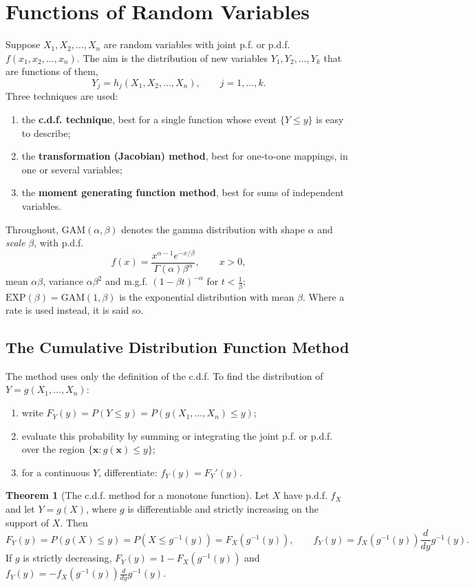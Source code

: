 \documentclass[12pt,a4paper]{report}
\theoremstyle{definition}
\newtheorem{thm}{Theorem}[section]
\theoremstyle{plain}
\begin{document}
\section{Functions of Random Variables}

Suppose $X_1, X_2, \dots , X_n$ are random variables with joint p.f. or p.d.f.
$f(x_1, x_2, \dots , x_n)$. The aim is the distribution of new variables
$Y_1, Y_2, \dots, Y_k$ that are functions of them,
\[Y_j = h_j(X_1, X_2, \dots, X_n),\qquad j = 1,\dots,k .\]
Three techniques are used:
\begin{enumerate}
\item the \textbf{c.d.f. technique}, best for a single function whose event
$\{Y\leq y\}$ is easy to describe;
\item the \textbf{transformation (Jacobian) method}, best for one-to-one
mappings, in one or several variables;
\item the \textbf{moment generating function method}, best for sums of
independent variables.
\end{enumerate}

Throughout, $\text{GAM}(\alpha,\beta)$ denotes the gamma distribution with shape
$\alpha$ and \emph{scale} $\beta$, with p.d.f.
\[f(x) = \frac{x^{\alpha - 1}e^{-x/\beta}}{\Gamma(\alpha)\beta^\alpha},\qquad
x>0 ,\]
mean $\alpha\beta$, variance $\alpha\beta^2$ and m.g.f. $(1 - \beta t)^{-\alpha}$
for $t<\frac1\beta$; $\text{EXP}(\beta) = \text{GAM}(1,\beta)$ is the exponential
distribution with mean $\beta$. Where a rate is used instead, it is said so.

\subsection{The Cumulative Distribution Function Method}

The method uses only the definition of the c.d.f. To find the distribution of
$Y = g(X_1,\dots,X_n)$:
\begin{enumerate}
\item write $F_Y(y) = P(Y \leq y) = P(g(X_1, \dots, X_n) \leq y)$;
\item evaluate this probability by summing or integrating the joint p.f. or
p.d.f. over the region $\{\mathbf x : g(\mathbf x) \leq y\}$;
\item for a continuous $Y$, differentiate: $f_Y(y) = F_Y'(y)$.
\end{enumerate}

\begin{thm}[The c.d.f. method for a monotone function]
\label{thm:cdfmonotone}
Let $X$ have p.d.f. $f_X$ and let $Y = g(X)$, where $g$ is differentiable and
strictly increasing on the support of $X$. Then
\[F_Y(y) = P(g(X)\leq y) = P\left(X \leq g^{-1}(y)\right) = F_X\left(g^{-1}(y)
\right) ,\qquad f_Y(y) = f_X\left(g^{-1}(y)\right)\frac{d}{dy}g^{-1}(y) .\]
If $g$ is strictly decreasing, $F_Y(y) = 1 - F_X\left(g^{-1}(y)\right)$ and
$f_Y(y) = -f_X\left(g^{-1}(y)\right)\frac{d}{dy}g^{-1}(y)$.
\end{thm}
\end{document}
